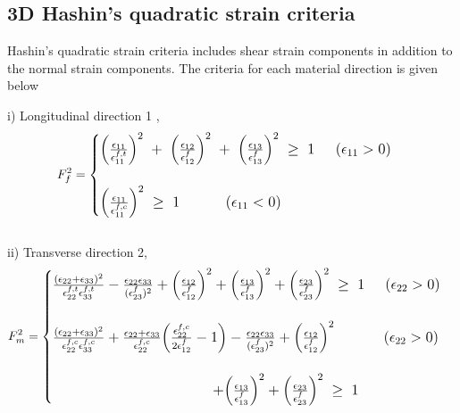 \documentclass[12pt,twoside]{report}
\begin{document}
\subsection{3D Hashin's quadratic strain criteria}\label{3D Hashin's quadratic strain criteria}
\indent\indent\indent Hashin's quadratic strain criteria includes shear strain components in addition to the normal strain components. The criteria for each material direction is given below

i) Longitudinal direction 1 ,
\begin{equation}
\large{F_{f}^{2} =  
	\begin{cases}
	
		\Big(\frac{\epsilon_{11}}{\epsilon_{11}^{f,t}}\Big)^{2} \; + \; \Big(\frac{\epsilon_{12}}{\epsilon_{12}^{f}}\Big)^{2} \; + \; \Big(\frac{\epsilon_{13}}{\epsilon_{13}^{f}}\Big)^{2} \; \geq  \; 1  \; \; \; \; \;  (\epsilon_{11}  >  0)  \\
	\\
	\Big(\frac{\epsilon_{11}}{\epsilon_{11}^{f,c}}\Big)^{2}  \; \geq  \; 1 \; \; \; \; \; \; \;  \; \; \; \;  (\epsilon_{11}  <  0) 

	
	\end{cases}}
\end{equation}
\\
ii) Transverse direction 2,
\\
\begin{equation}
\large{F_{m}^{2} =  
	\begin{cases}
	
	\frac{(\epsilon_{22} + \epsilon_{33} )^{2}}{\epsilon_{22}^{f,t} \epsilon_{33}^{f,t}}   -  \frac{\epsilon_{22}\epsilon_{33}}{(\epsilon_{23}^{f})^{2}}  +  \Big(\frac{\epsilon_{12}}{\epsilon_{12}^{f}}\Big)^{2}  + \Big(\frac{\epsilon_{13}}{\epsilon_{13}^{f}}\Big)^{2}  +  \Big(\frac{\epsilon_{23}}{\epsilon_{23}^{f}}\Big)^{2} \;\geq  \; 1 \; \; \; \; \;  (\epsilon_{22}  >  0) \\
	\\
	
	\frac{(\epsilon_{22} + \epsilon_{33} )^{2}}{\epsilon_{22}^{f,c} \epsilon_{33}^{f,c}}  +  \frac{\epsilon_{22} + \epsilon_{33}}{\epsilon_{22}^{f,c}}\Big(\frac{\epsilon_{22}^{f,c}}{2\epsilon_{12}^{f}}  -  1\Big)   -  \frac{\epsilon_{22}\epsilon_{33}}{(\epsilon_{23}^{f})^{2}}  +  \Big(\frac{\epsilon_{12}}{\epsilon_{12}^{f}}\Big)^{2}\; \; \; \; \; \; \; \; \; \; \; \;  (\epsilon_{22}  >  0) \\ 
\\	
	\; \; \; \; \; \; \; \;\; \; \; \; \; \; \; \;\; \; \; \; \; \; \; \;  \; \;\; \; \; \; \; \; \; \;\; \; \; \; \;  + \Big(\frac{\epsilon_{13}}{\epsilon_{13}^{f}}\Big)^{2}   +  \Big(\frac{\epsilon_{23}}{\epsilon_{23}^{f}}\Big)^{2} \;\geq \; 1 
	
	
	\end{cases}}
\end{equation}
\\
\end{document}
